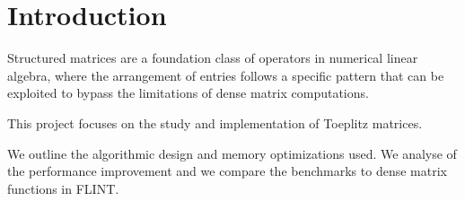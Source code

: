 \section{Introduction}

Structured matrices are a foundation class of operators in numerical linear algebra, 
where the arrangement of entries follows a specific pattern that can be exploited to bypass the limitations of dense matrix computations. 

This project focuses on the study and implementation of Toeplitz matrices.

We outline the algorithmic design and memory optimizations used. We analyse of the performance improvement and we compare
the benchmarks to dense matrix functions in FLINT\cite{flint331}.